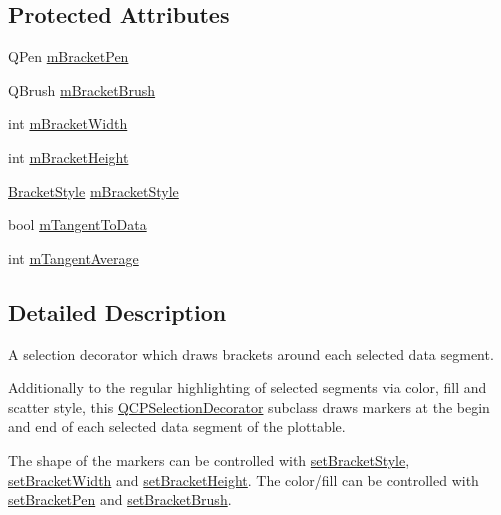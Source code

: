 \subsection*{Protected Attributes}
\begin{DoxyCompactItemize}
\item 
Q\+Pen \mbox{\hyperlink{class_q_c_p_selection_decorator_bracket_ac7da5610713e67e92d0a882ef743a453}{m\+Bracket\+Pen}}
\item 
Q\+Brush \mbox{\hyperlink{class_q_c_p_selection_decorator_bracket_ae905dd458b85ac529fb9c6ec879e5680}{m\+Bracket\+Brush}}
\item 
int \mbox{\hyperlink{class_q_c_p_selection_decorator_bracket_a333983308322d10968c35bf2af4b392d}{m\+Bracket\+Width}}
\item 
int \mbox{\hyperlink{class_q_c_p_selection_decorator_bracket_a3887d29b82f4dec3bf2ddf97d5475b16}{m\+Bracket\+Height}}
\item 
\mbox{\hyperlink{class_q_c_p_selection_decorator_bracket_aa6d18517ec0553575bbef0de4252336e}{Bracket\+Style}} \mbox{\hyperlink{class_q_c_p_selection_decorator_bracket_a5ed4965200caa115da1a49f2f860e23c}{m\+Bracket\+Style}}
\item 
bool \mbox{\hyperlink{class_q_c_p_selection_decorator_bracket_ac08c7de0fd81b64b0f3fe31739688081}{m\+Tangent\+To\+Data}}
\item 
int \mbox{\hyperlink{class_q_c_p_selection_decorator_bracket_a810900616f17964cab140cbc13f40203}{m\+Tangent\+Average}}
\end{DoxyCompactItemize}


\subsection{Detailed Description}
A selection decorator which draws brackets around each selected data segment. 

Additionally to the regular highlighting of selected segments via color, fill and scatter style, this \mbox{\hyperlink{class_q_c_p_selection_decorator}{Q\+C\+P\+Selection\+Decorator}} subclass draws markers at the begin and end of each selected data segment of the plottable.

The shape of the markers can be controlled with \mbox{\hyperlink{class_q_c_p_selection_decorator_bracket_a04507697438f6ad8cc2aeea5422dcbe5}{set\+Bracket\+Style}}, \mbox{\hyperlink{class_q_c_p_selection_decorator_bracket_a291b59cab98ce93a0a3c85963fe10f5e}{set\+Bracket\+Width}} and \mbox{\hyperlink{class_q_c_p_selection_decorator_bracket_aed773ad737201cca40efc6fe451acad8}{set\+Bracket\+Height}}. The color/fill can be controlled with \mbox{\hyperlink{class_q_c_p_selection_decorator_bracket_ac0e392a6097990f8aa978932a8fa05d6}{set\+Bracket\+Pen}} and \mbox{\hyperlink{class_q_c_p_selection_decorator_bracket_a2f4ea0bfb0ea980252b76dd349dd53aa}{set\+Bracket\+Brush}}.

